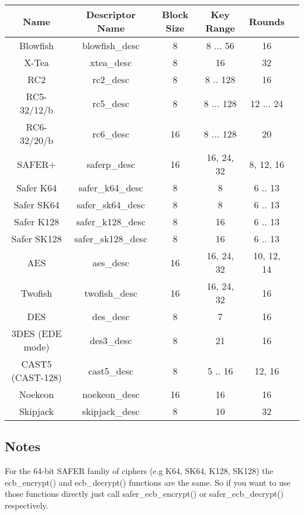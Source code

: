 \documentclass[b5paper]{book}
\begin{document}
\begin{small}
\begin{center}
\begin{tabular}{|c|c|c|c|c|c|}
     \hline Name & Descriptor Name & Block Size & Key Range & Rounds \\
     \hline Blowfish & blowfish\_desc & 8 & 8 ... 56 & 16 \\
     \hline X-Tea & xtea\_desc & 8 & 16 & 32 \\
     \hline RC2 & rc2\_desc & 8 & 8 .. 128 & 16 \\
     \hline RC5-32/12/b & rc5\_desc & 8 & 8 ... 128 & 12 ... 24 \\
     \hline RC6-32/20/b & rc6\_desc & 16 & 8 ... 128 & 20 \\
     \hline SAFER+ & saferp\_desc &16 & 16, 24, 32 & 8, 12, 16 \\
     \hline Safer K64   & safer\_k64\_desc & 8 & 8 & 6 .. 13 \\
     \hline Safer SK64  & safer\_sk64\_desc & 8 & 8 & 6 .. 13 \\
     \hline Safer K128  & safer\_k128\_desc & 8 & 16 & 6 .. 13 \\
     \hline Safer SK128 & safer\_sk128\_desc & 8 & 16 & 6 .. 13 \\
     \hline AES & aes\_desc & 16 & 16, 24, 32 & 10, 12, 14 \\
     \hline Twofish & twofish\_desc & 16 & 16, 24, 32 & 16 \\
     \hline DES & des\_desc & 8 & 7 & 16 \\
     \hline 3DES (EDE mode) & des3\_desc & 8 & 21 & 16 \\
     \hline CAST5 (CAST-128) & cast5\_desc & 8 & 5 .. 16 & 12, 16 \\
     \hline Noekeon & noekeon\_desc & 16 & 16 & 16 \\
     \hline Skipjack & skipjack\_desc & 8 & 10 & 32 \\
     \hline
\end{tabular}
\end{center}
\end{small}

\subsection{Notes}
For the 64-bit SAFER famliy of ciphers (e.g K64, SK64, K128, SK128) the ecb\_encrypt() and ecb\_decrypt()
functions are the same.  So if you want to use those functions directly just call safer\_ecb\_encrypt()
or safer\_ecb\_decrypt() respectively.
\end{document}
